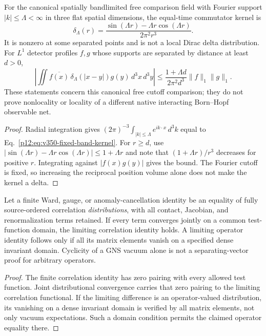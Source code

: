 \documentclass[12pt,a4paper]{article}
\begin{document}
\begin{proposition}
\label{p12:prop:v350-fixed-band-nonlocality-bound}
For the canonical spatially bandlimited free comparison field
with Fourier support $|k|\le\Lambda<\infty$ in three flat
spatial dimensions, the equal-time commutator kernel is
\begin{equation}
\label{p12:eq:v350-fixed-band-kernel}
 \delta_\Lambda(r)=
 \frac{\sin(\Lambda r)-\Lambda r\cos(\Lambda r)}{2\pi^2r^3}.
\end{equation}
It is nonzero at some separated points and is not a local
Dirac delta distribution. For $L^1$ detector profiles $f,g$
whose supports are separated by distance at least $d>0$,
\begin{equation}
\label{p12:eq:v350-detector-bound}
 \left|\iint \overline{f(x)}\,\delta_\Lambda(|x-y|)g(y)
                     \,d^3x\,d^3y\right|
 \le\frac{1+\Lambda d}{2\pi^2d^3}\|f\|_1\|g\|_1.
\end{equation}
These statements concern this canonical free cutoff comparison;
they do not prove nonlocality or locality of a different
native interacting Born--Hopf observable net.
\end{proposition}
\begin{proof}
Radial integration gives
$(2\pi)^{-3}\int_{|k|\le\Lambda}e^{ik\cdot x}\,d^3k$
equal to Eq.~\eqref{p12:eq:v350-fixed-band-kernel}.
For $r\ge d$, use
$|\sin(\Lambda r)-\Lambda r\cos(\Lambda r)|\le1+\Lambda r$
and note that $(1+\Lambda r)/r^3$ decreases for positive
$r$. Integrating against $|f(x)g(y)|$ gives the bound.
The Fourier cutoff is fixed, so increasing the reciprocal
position volume alone does not make the kernel a delta.
\end{proof}

\begin{proposition}
\label{p12:prop:v350-ward-identity-transfer}
Let a finite Ward, gauge, or anomaly-cancellation identity
be an equality of fully source-ordered correlation
\emph{distributions}, with all contact, Jacobian, and
renormalization terms retained. If every term converges
jointly on a common test-function domain, the limiting
correlation identity holds. A limiting operator identity
follows only if all its matrix elements vanish on a
specified dense invariant domain. Cyclicity of a GNS vacuum
alone is not a separating-vector proof for arbitrary operators.
\end{proposition}
\begin{proof}
The finite correlation identity has zero pairing with every
allowed test function. Joint distributional convergence carries
that zero pairing to the limiting correlation functional.
If the limiting difference is an operator-valued distribution,
its vanishing on a dense invariant domain is verified by all
matrix elements, not only vacuum expectations. Such a domain
condition permits the claimed operator equality there.
\end{proof}
\end{document}
